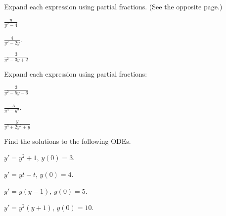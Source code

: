 

\begin{problem}
\item Expand each expression using partial fractions. (See the
  opposite page.)
  \begin{subproblem}
  \item $\frac{y}{y^2-4}$
    \vfill

  \item $\frac{4}{y^2-2y}$.
    \vfill

    \clearpage
      
  \item $\frac{3}{y^2-3y+2}$
    \vfill

  \end{subproblem}
\end{problem}


  \begin{problem}
  \item Expand each expression using partial fractions:
    \begin{subproblem}
    \item $\frac{3}{y^2-5y-6}$
      \vfill

    \item $\frac{-5}{y^3-y^2}$.
      \vfill
      
    \item $\frac{y}{y^3+2y^2+y}$
      \vfill

    \end{subproblem}
    \clearpage
  \item Find the solutions to the following ODEs. 
    \begin{subproblem}
    \item $y' = y^2 + 1$, $y(0)=3$.
      \vfill
    \item $y' = yt - t$, $y(0)=4$.
      \vfill
    \item $y'=y(y-1)$, $y(0)=5$.
      \vfill
    \item $y' = y^2(y+1)$, $y(0)=10$.
      \vfill
    \end{subproblem}

  \end{problem}


